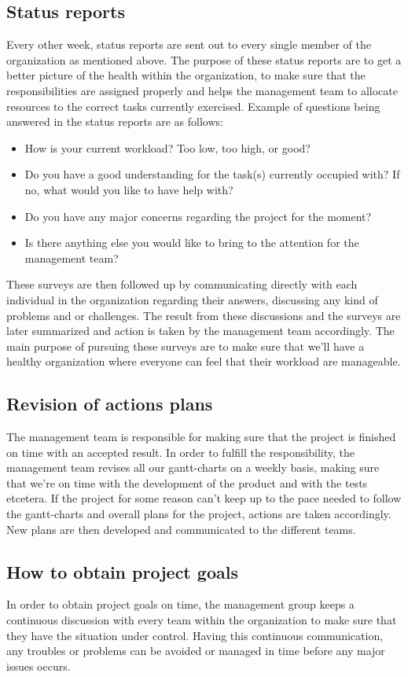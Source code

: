 \subsection{Status reports}
Every other week, status reports are sent out to every single member of the organization as mentioned above. The purpose of these status reports are to get a better picture of the health within the organization, to make sure that the responsibilities are assigned properly and helps the management team to allocate resources to the correct tasks currently exercised. Example of questions being answered in the status reports are as follows:

\begin{itemize}
    \item How is your current workload? Too low, too high, or good?
    \item Do you have a good understanding for the task(s) currently occupied with? If no, what would you like to have help with?
    \item Do you have any major concerns regarding the project for the moment?
    \item Is there anything else you would like to bring to the attention for the management team?
\end{itemize}

These surveys are then followed up by communicating directly with each individual in the organization regarding their answers, discussing any kind of problems and or challenges. The result from these discussions and the surveys are later summarized and action is taken by the management team accordingly. The main purpose of pursuing these surveys are to make sure that we'll have a healthy organization where everyone can feel that their workload are manageable. 

\subsection{Revision of actions plans}
The management team is responsible for making sure that the project is finished on time with an accepted result. In order to fulfill the responsibility, the management team revises all our gantt-charts on a weekly basis, making sure that we're on time with the development of the product and with the tests etcetera. If the project for some reason can't keep up to the pace needed to follow the gantt-charts and overall plans for the project, actions are taken accordingly. New plans are then developed and communicated to the different teams. 

\subsection{How to obtain project goals}
In order to obtain project goals on time, the management group keeps a continuous discussion with every team within the organization to make sure that they have the situation under control. Having this continuous communication, any troubles or problems can be avoided or managed in time before any major issues occurs. 